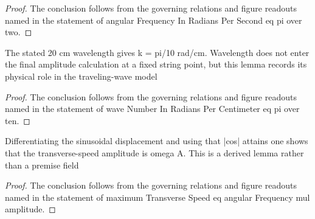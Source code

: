 \begin{proof}
  The conclusion follows from the governing relations and figure readouts named in the statement of angular Frequency In Radians Per Second eq pi over two.
\end{proof}
\begin{lemma}
  \label{lem:physics:phyx-mini-0305:phyxminiproblems-problemphyxmini0305-wavenumberinradianspercentimeter-eq-pi-over-ten}
  The stated 20 cm wavelength gives k = pi/10 rad/cm. Wavelength does not enter the final amplitude calculation at a fixed string point, but this lemma records its physical role in the traveling-wave model
\end{lemma}
\begin{proof}
  The conclusion follows from the governing relations and figure readouts named in the statement of wave Number In Radians Per Centimeter eq pi over ten.
\end{proof}
\begin{lemma}
  \label{lem:physics:phyx-mini-0305:phyxminiproblems-problemphyxmini0305-maximumtransversespeed-eq-angularfrequency-mul-amplitude}
  Differentiating the sinusoidal displacement and using that |cos| attains one shows that the transverse-speed amplitude is omega A. This is a derived lemma rather than a premise field
\end{lemma}
\begin{proof}
  The conclusion follows from the governing relations and figure readouts named in the statement of maximum Transverse Speed eq angular Frequency mul amplitude.
\end{proof}
